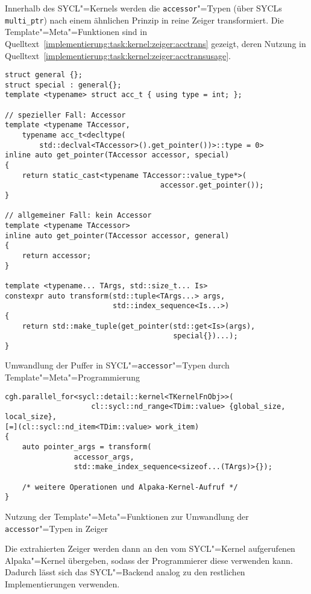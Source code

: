Innerhalb des SYCL"=Kernels werden die \texttt{accessor}"=Typen (über SYCLs
\texttt{multi\_ptr}) nach einem ähnlichen Prinzip in reine Zeiger transformiert.
Die Template"=Meta"=Funktionen sind in
Quelltext~\ref{implementierung:task:kernel:zeiger:acctrans} gezeigt, deren
Nutzung in Quelltext~\ref{implementierung:task:kernel:zeiger:acctransusage}.

\begin{code}
    \begin{verbatim}
struct general {};
struct special : general{};
template <typename> struct acc_t { using type = int; };

// spezieller Fall: Accessor
template <typename TAccessor,
    typename acc_t<decltype(
        std::declval<TAccessor>().get_pointer())>::type = 0>
inline auto get_pointer(TAccessor accessor, special)
{
    return static_cast<typename TAccessor::value_type*>(
                                    accessor.get_pointer());
}

// allgemeiner Fall: kein Accessor
template <typename TAccessor>
inline auto get_pointer(TAccessor accessor, general)
{
    return accessor;
}

template <typename... TArgs, std::size_t... Is>
constexpr auto transform(std::tuple<TArgs...> args,
                         std::index_sequence<Is...>)
{
    return std::make_tuple(get_pointer(std::get<Is>(args),
                                       special{})...);
}
    \end{verbatim}
    \caption{Umwandlung der Puffer in SYCL"=\texttt{accessor}"=Typen durch
             Template"=Meta"=Programmierung}
    \label{implementierung:task:kernel:zeiger:acctrans}
\end{code}

\begin{code}
    \begin{verbatim}
cgh.parallel_for<sycl::detail::kernel<TKernelFnObj>>(
                    cl::sycl::nd_range<TDim::value> {global_size, local_size},
[=](cl::sycl::nd_item<TDim::value> work_item)
{
    auto pointer_args = transform(
                accessor_args,
                std::make_index_sequence<sizeof...(TArgs)>{});

    /* weitere Operationen und Alpaka-Kernel-Aufruf */
}
    \end{verbatim}
    \caption{Nutzung der Template"=Meta"=Funktionen zur Umwandlung der
             \texttt{accessor}"=Typen in Zeiger}
    \label{implementierung:task:kernel:zeiger:acctransusage}
\end{code}
Die extrahierten Zeiger werden dann an den vom SYCL"=Kernel aufgerufenen
Alpaka"=Kernel übergeben, sodass der Programmierer diese verwenden kann.
Dadurch lässt sich das SYCL"=Backend analog zu den restlichen Implementierungen
verwenden.

